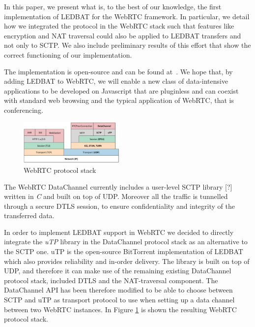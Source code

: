 \documentclass{sig-alternate}
\begin{document}
In this paper, we present what is, to the best of our knowledge, the first implementation
of LEDBAT for the WebRTC framework. In particular, we detail how we integrated the
protocol in the WebRTC stack such that features like encryption and NAT traversal could also 
be applied to LEDBAT transfers and not only to SCTP. We also include
preliminary results of this effort that show the correct functioning of our
implementation.

The implementation is open-source and can be found at~\cite{}. We hope that, by adding
LEDBAT to WebRTC, we will enable a new class of data-intensive applications to be
developed on Javascript that are pluginless and can coexist with standard web browsing
and the typical application of WebRTC, that is conferencing.



\begin{figure}[t]
  \centering
    \includegraphics[width=0.46\textwidth]{figs/architecture2}
\vspace*{-0.38cm}
	\caption{WebRTC protocol stack} \label{fig:architecture}
\vspace*{-0.4cm}
\end{figure}


The WebRTC DataChannel currently includes a user-level SCTP library [?] written in \textit{C} and built on top of UDP. Moreover all the traffic is tunnelled through a secure DTLS session, to ensure confidentiality and integrity of the transferred data.

In order to implement LEDBAT support in WebRTC we decided to directly integrate the \textit{uTP} library \cite{utp-repo} in the DataChannel protocol stack as an alternative to the SCTP one. uTP is the open-source BitTorrent implementation of LEDBAT which also provides reliability and in-order delivery. The library is built on top of UDP, and therefore it can make use of the remaining existing DataChannel protocol stack, included DTLS and the NAT-traversal component. The DataChannel API has been therefore modified to be able to choose between SCTP and uTP as transport protocol to use when setting up a data channel between two WebRTC instances. In Figure \ref{fig:architecture} is shown the resulting WebRTC protocol stack.
\end{document}

